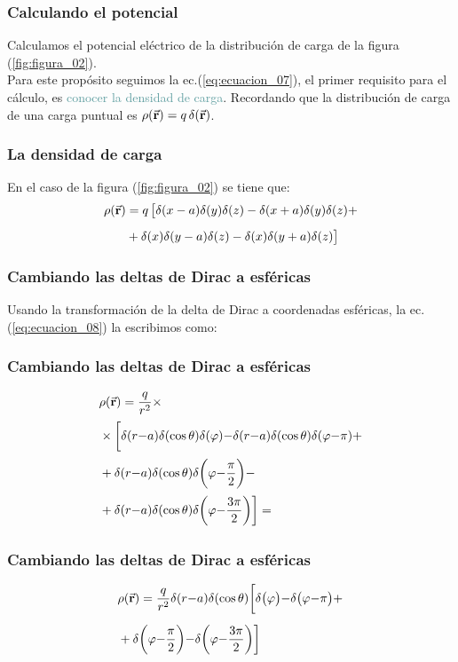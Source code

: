 \documentclass[12pt]{beamer}
\begin{document}
\begin{frame}
\frametitle{Calculando el potencial}
Calculamos el potencial eléctrico de la distribución de carga de la figura (\ref{fig:figura_02}).
\\
\bigskip
\pause
Para este propósito seguimos la ec.(\ref{eq:ecuacion_07}), \pause el primer requisito para el cálculo, \pause es \textcolor{cadetblue}{conocer la densidad de carga}. \pause Recordando que la distribución de carga de una carga puntual es $\rho (\va{r}) = q \, \delta (\va{r})$.
\end{frame}
\begin{frame}
\frametitle{La densidad de carga}
En el caso de la figura (\ref{fig:figura_02}) se tiene que:
\pause    
\begin{eqnarray}
\begin{aligned}[b]
\rho(\va{r}) &= q \, \big[ \delta (x - a) \delta(y) \delta(z) -  \delta (x + a) \delta(y) \delta(z) + \\[0.5em]
&+ \delta (x) \delta(y - a) \delta(z) - \delta (x) \delta(y + a) \delta(z) \big]
\end{aligned}
\end{eqnarray}
\label{eq:ecuacion_08}
\end{frame}
\begin{frame}
\frametitle{Cambiando las deltas de Dirac a esféricas}
Usando la transformación de la delta de Dirac a coordenadas esféricas, la ec. (\ref{eq:ecuacion_08}) la escribimos como:
\end{frame}
\begin{frame}
\frametitle{Cambiando las deltas de Dirac a esféricas}
\begin{align*}
&\rho(\va{r}) = \dfrac{q}{r^{2}} \times \\[0.2em]
&\times \bigg[ \delta(r {-} a) \delta(\cos \theta) \delta(\varphi) {-}  \delta(r {-} a) \delta(\cos \theta) \delta(\varphi {-} \pi) + \\[0.2em]
&+ \delta(r {-} a) \delta(\cos \theta) \delta \bigg(\varphi {-} \dfrac{\pi}{2} \bigg) {-} \\[0.2em]
&+ \delta(r {-} a) \delta(\cos \theta) \delta \bigg( \varphi {-} \dfrac{3 \pi}{2} \bigg) \bigg] = \\[0.2em]
\end{align*}
\end{frame}
\begin{frame}
\frametitle{Cambiando las deltas de Dirac a esféricas}
\begin{align}
\begin{aligned}[b]
&\rho(\va{r}) = \dfrac{q}{r^{2}} \delta(r {-} a) \delta(\cos \theta) \bigg[ \delta \big(\varphi \big) {-} \delta \big(\varphi {-} \pi \big) {+} \\[0.5em]
&+ \delta \bigg( \varphi {-} \dfrac{\pi}{2} \bigg) {-} \delta \bigg(\varphi {-} \dfrac{3 \pi}{2} \bigg) \bigg]
\end{aligned}
\label{eq:ecuacion_09}
\end{align}
\end{frame}
\end{document}
